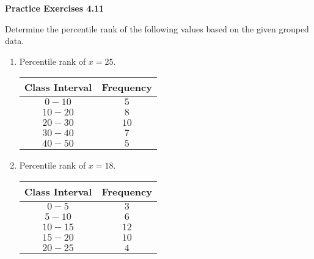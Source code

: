 \vspace{0.3ex}
\noindent\textbf{Practice Exercises 4.11}

\vspace{0.2ex}

Determine the percentile rank of the following values based on the given grouped data.  
\begin{multicols}{2}
\begin{enumerate}
\item Percentile rank of \(x = 25\).
  
    \begin{tabular}{|c|c|}
        \hline
        Class Interval & Frequency \\ \hline
        \(0 - 10\) & \(5\) \\ \hline
        \(10 - 20\) & \(8\) \\ \hline
        \(20 - 30\) & \(10\) \\ \hline
        \(30 - 40\) & \(7\) \\ \hline
        \(40 - 50\) & \(5\) \\ \hline
    \end{tabular}
    
  \item Percentile rank of \(x = 18\).
    
    \begin{tabular}{|c|c|}
        \hline
        Class Interval & Frequency \\ \hline
        \(0 - 5\) & \(3\) \\ \hline
        \(5 - 10\) & \(6\) \\ \hline
        \(10 - 15\) & \(12\) \\ \hline
        \(15 - 20\) & \(10\) \\ \hline
        \(20 - 25\) & \(4\) \\ \hline
    \end{tabular}
\end{enumerate}
\end{multicols}
